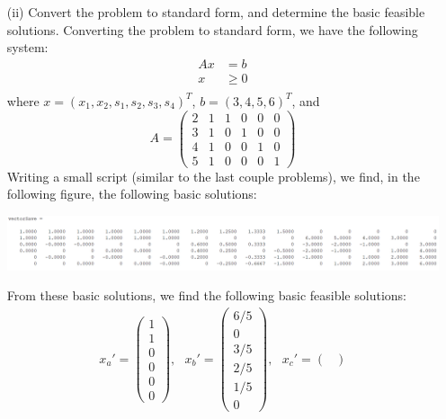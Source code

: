 \documentclass{article}
\begin{document}
\begin{itemize}
    \item[(ii)] Convert the problem to standard form, and determine the basic feasible solutions.
    \newline\newline
    Converting the problem to standard form, we have the following system:
    \begin{align*}
        Ax &= b\\
        x &\geq 0\\
    \end{align*}
    where $x = (x_1, x_2, s_1, s_2, s_3, s_4)^T$, $b = (3, 4, 5, 6)^T$, and 
    \[A = \begin{pmatrix}
        2 & 1 & 1 & 0 & 0 & 0\\
        3 & 1 & 0 & 1 & 0 & 0\\
        4 & 1 & 0 & 0 & 1 & 0\\
        5 & 1 & 0 & 0 & 0 & 1
    \end{pmatrix}\]
    Writing a small script (similar to the last couple problems), we find, in the following figure, the following basic solutions:
    \begin{center}
        \includegraphics[scale = 0.5]{15vectors}
    \end{center}
    From these basic solutions, we find the following basic feasible solutions:
    \begin{align*}
        x_a' = \begin{pmatrix}
            1\\
            1\\
            0\\
            0\\
            0\\
            0
        \end{pmatrix}
        ,\:\:\:
        x_b' = \begin{pmatrix}
            6/5\\
            0\\
            3/5\\
            2/5\\
            1/5\\
            0
        \end{pmatrix}
        ,\:\:\:
        x_c' = \begin{pmatrix}

\end{pmatrix}
\end{align*}
\end{itemize}
\end{document}
